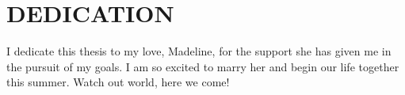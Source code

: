 \chapter*{DEDICATION}

I dedicate this thesis to my love, Madeline, for the support she has given me in the pursuit of my goals. I am so excited to marry her and begin our life together this summer. Watch out world, here we come!